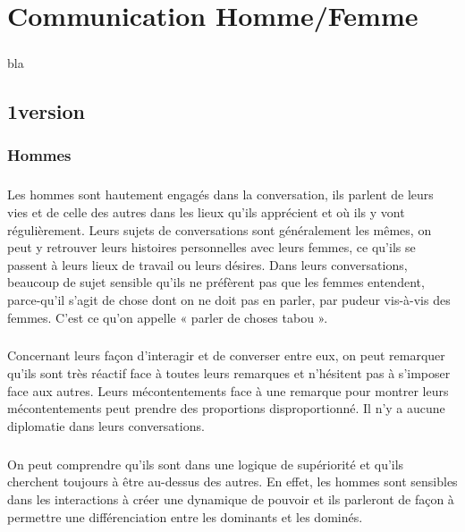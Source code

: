 \chapter{Communication Homme/Femme}
\paragraph{}
bla

\section{1\ier version}
\subsection{Hommes}
\paragraph{}
Les hommes sont hautement engagés dans la conversation, ils parlent de leurs vies et de celle des autres dans
les lieux qu’ils apprécient et où ils y vont régulièrement. Leurs sujets de conversations sont généralement les
mêmes, on peut y retrouver leurs histoires personnelles avec leurs femmes, ce qu’ils se passent à leurs lieux
de travail ou leurs désires. Dans leurs conversations, beaucoup de sujet sensible qu'ils ne préfèrent pas que
les femmes entendent, parce-qu'il s'agit de chose dont on ne doit pas en parler, par pudeur vis-à-vis des
femmes. C'est ce qu'on appelle « parler de choses tabou ».

\paragraph{}
Concernant leurs façon d’interagir et de converser entre eux, on peut remarquer qu'ils sont très réactif face à
toutes leurs remarques et n’hésitent pas à s’imposer face aux autres. Leurs mécontentements face à une
remarque pour montrer leurs mécontentements peut prendre des proportions disproportionné. Il n'y a aucune
diplomatie dans leurs conversations.

\paragraph{}
On peut comprendre qu'ils sont dans une logique de supériorité et qu'ils cherchent toujours à être au-dessus
des autres. En effet, les hommes sont sensibles dans les interactions à créer une dynamique de pouvoir et ils
parleront de façon à permettre une différenciation entre les dominants et les dominés.


